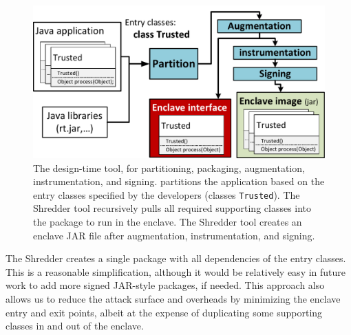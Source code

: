 \begin{figure}[t!]
\centering
\includegraphics[width=4.5in]{civet/figures/building-tool.pdf}
\caption[Overview of the \sysname{} design-time tool]
{The \sysname{} design-time tool, for partitioning, packaging, augmentation, instrumentation, and signing.
\sysname{} partitions the \java{} application based on the entry classes
specified by the developers (classes {\tt Trusted}).
The Shredder tool recursively pulls all required supporting classes into the 
package to run in the enclave.
The Shredder tool creates an enclave JAR file after augmentation,
instrumentation, and signing.}
\label{fig:civet:builder}
\end{figure}

The Shredder creates a single package with all dependencies of the
entry classes.
This is a reasonable simplification, although 
it would be relatively easy in future work to add more signed JAR-style packages,
if needed.
This approach also allows us to 
reduce the attack surface and overheads by minimizing the 
enclave entry and exit points, albeit at the expense of duplicating some supporting
classes in and out of the enclave.




